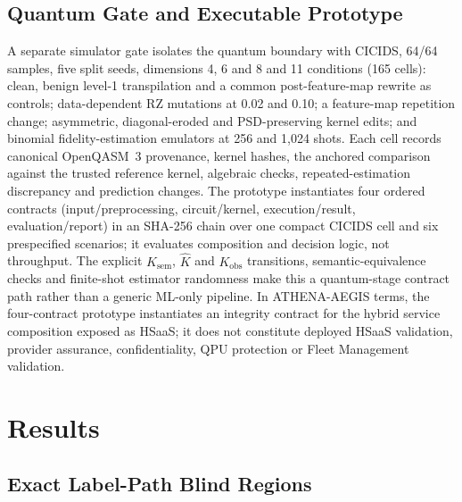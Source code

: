 \documentclass[10pt,journal,compsoc]{IEEEtran}
\begin{document}
\subsection{Quantum Gate and Executable Prototype}

A separate simulator gate isolates the quantum boundary with CICIDS, 64/64
samples, five split seeds, dimensions 4, 6 and 8 and 11 conditions (165
cells): clean, benign level-1 transpilation and a common post-feature-map
rewrite as controls; data-dependent RZ mutations at 0.02 and 0.10; a
feature-map repetition change; asymmetric, diagonal-eroded and PSD-preserving
kernel edits; and binomial fidelity-estimation emulators at 256 and 1,024
shots. Each cell records canonical OpenQASM~3 provenance, kernel hashes, the
anchored comparison against the trusted reference kernel, algebraic checks,
repeated-estimation discrepancy and prediction changes. The prototype
instantiates four ordered contracts (input/preprocessing, circuit/kernel,
execution/result, evaluation/report) in an SHA-256 chain over one compact
CICIDS cell and six prespecified scenarios; it evaluates composition and
decision logic, not throughput. The explicit $K_{\mathrm{sem}}$, $\hat K$ and
$K_{\mathrm{obs}}$ transitions, semantic-equivalence checks and finite-shot
estimator randomness make this a quantum-stage contract path rather than a
generic ML-only pipeline. In ATHENA-AEGIS terms, the four-contract prototype
instantiates an integrity contract for the hybrid service composition exposed
as HSaaS; it does not constitute deployed HSaaS validation, provider assurance,
confidentiality, QPU protection or Fleet Management validation.

\section{Results}

\subsection{Exact Label-Path Blind Regions}
\end{document}
